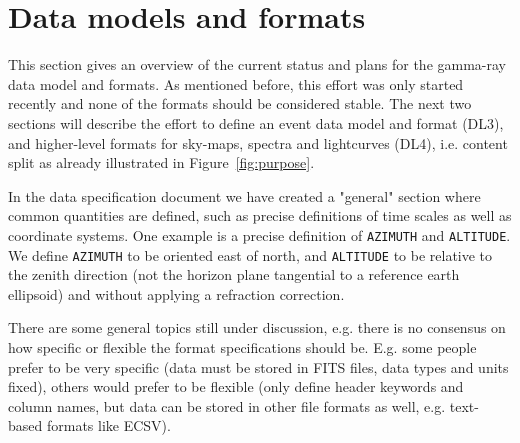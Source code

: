 \section{Data models and formats}

This section gives an overview of the current status and plans for the gamma-ray data model and formats. As mentioned before, this effort was only started recently and none of the formats should be considered stable. The next two sections will describe the effort to define an event data model and format (DL3), and higher-level formats for sky-maps, spectra and lightcurves (DL4), i.e. content split as already illustrated in Figure~\ref{fig:purpose}.

In the data specification document we have created a "general" section where common quantities are defined, such as precise definitions of time scales as well as coordinate systems. One example is a precise definition of \texttt{AZIMUTH} and \texttt{ALTITUDE}. We define \texttt{AZIMUTH} to be oriented east of north, and \texttt{ALTITUDE} to be relative to the zenith direction (not the horizon plane tangential to a reference earth ellipsoid) and without applying a refraction correction.

There are some general topics still under discussion, e.g. there is no consensus on how specific or flexible the format specifications should be. E.g. some people prefer to be very specific (data must be stored in FITS files, data types and units fixed), others would prefer to be flexible (only define header keywords and column names, but data can be stored in other file formats as well, e.g. text-based formats like ECSV).
% 




